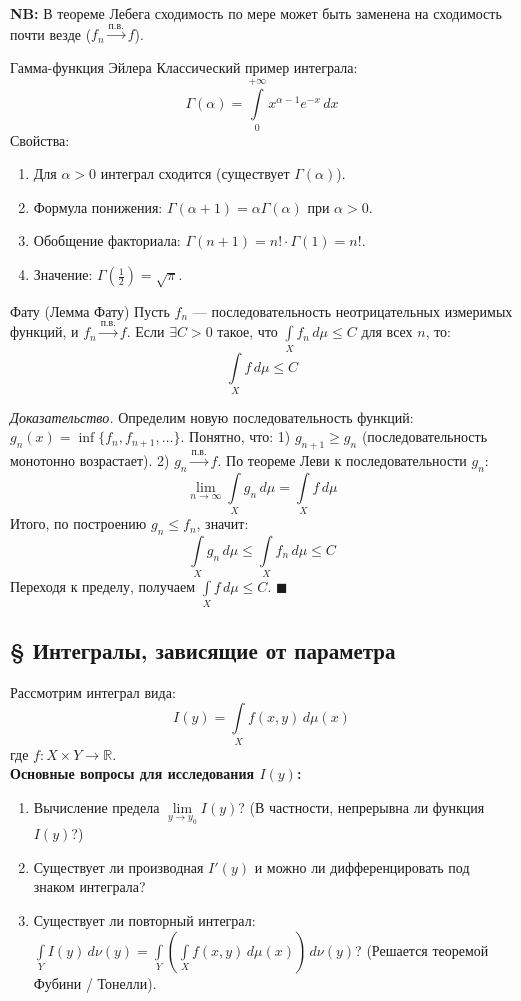 \documentclass[12pt,a4paper]{article}
\newenvironment{Proof}[1][Доказательство]{\vspace{0.5em}\noindent\textit{#1.}\hspace{0.5em}\ignorespaces}{\hfill$\blacksquare$\vspace{1em}}
\begin{document}
\noindent \textbf{NB:} В теореме Лебега сходимость по мере может быть заменена на сходимость почти везде ($f_n \xrightarrow{\text{п.в.}} f$).

\begin{Definition}{Гамма-функция Эйлера}{}
Классический пример интеграла:
$$ \Gamma(\alpha) = \int\limits_0^{+\infty} x^{\alpha - 1} e^{-x} \, dx $$
Свойства:
\begin{enumerate}
    \item Для $\alpha > 0$ интеграл сходится (существует $\Gamma(\alpha)$).
    \item Формула понижения: $\Gamma(\alpha + 1) = \alpha \Gamma(\alpha)$ при $\alpha > 0$.
    \item Обобщение факториала: $\Gamma(n + 1) = n! \cdot \Gamma(1) = n!$.
    \item Значение: $\Gamma\left(\frac{1}{2}\right) = \sqrt{\pi}$.
\end{enumerate}
\end{Definition}

\begin{Theorem}{Фату (Лемма Фату)}{}
Пусть $f_n$ — последовательность неотрицательных измеримых функций, и $f_n \xrightarrow{\text{п.в.}} f$. Если $\exists C > 0$ такое, что $\int\limits_X f_n \, d\mu \le C$ для всех $n$, то:
$$ \int\limits_X f \, d\mu \le C $$
\end{Theorem}

\begin{Proof}
Определим новую последовательность функций: $g_n(x) = \inf\{f_n, f_{n+1}, \dots\}$. 
Понятно, что:
1) $g_{n+1} \ge g_n$ (последовательность монотонно возрастает).
2) $g_n \xrightarrow{\text{п.в.}} f$.
По теореме Леви к последовательности $g_n$:
$$ \lim\limits_{n \to \infty} \int\limits_X g_n \, d\mu = \int\limits_X f \, d\mu $$
Итого, по построению $g_n \le f_n$, значит:
$$ \int\limits_X g_n \, d\mu \le \int\limits_X f_n \, d\mu \le C $$
Переходя к пределу, получаем $\int\limits_X f \, d\mu \le C$.
\end{Proof}

\subsection{§ Интегралы, зависящие от параметра}

Рассмотрим интеграл вида:
$$ I(y) = \int\limits_X f(x, y) \, d\mu(x) $$
где $f : X \times Y \to \mathbb{R}$. \\
\textbf{Основные вопросы для исследования $I(y)$:}
\begin{enumerate}
    \item Вычисление предела $\lim\limits_{y \to y_0} I(y)$? (В частности, непрерывна ли функция $I(y)$?)
    \item Существует ли производная $I'(y)$ и можно ли дифференцировать под знаком интеграла?
    \item Существует ли повторный интеграл: $\int\limits_Y I(y) \, d\nu(y) = \int\limits_Y \left( \int\limits_X f(x,y) \, d\mu(x) \right) \, d\nu(y)$? (Решается теоремой Фубини / Тонелли).
\end{enumerate}
\end{document}
